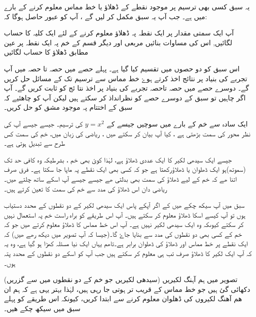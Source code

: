 
یہ سبق کسی بھی  ترسیم پر موجود نقطے کے ڈھلاؤ یا خط مماس معلوم کرنے کے بارے میں ہے۔  جب آپ یہ سبق مکمل کر لیں گے ، آپ کو عبور حاصل ہوگا کہ:
 
 
آپ ایک سمتی مقدار پر ایک نقطہ پہ  ڈھلاؤ معلوم کرنے کے لئے ایک کلیہ کا حساب لگائیں, اس کی مساوات بنائیں
 مربعی اور دیگر قسم کے خم پہ ایک نقطہ پر عین مطابق ڈھلاؤ کا حساب لگائیں 
 

اس سبق کو دو حصوں میں تقسیم کیا گیا ہے۔ پہلے حصے میں حصہ  تا حصہ   میں آپ تجربے کی بنیاد پر نتائج اخذ کرتے ہوۓ خط مماس سے ترسیم تک کے مسائل حل کریں گے۔ دوسرے حصے میں حصہ   تاحصہ   تجربے کی بنیاد پر اخذ   نتا ئج کو  ثابت کریں گے۔
آپ اگر چاہیں تو سبق کے دوسرے حصے کو نظرانداذ کر سکتے ہیں لیکن آپ کو چاھئیے کہ سبق کے اختتام پہ موجود مشق کو حل کریں۔

 
ایک سادہ سے خم کے بارے میں سوچیں جیسے کے  \( y=x^{2}\) کی ترسیم۔ جیسے جیسے  آپ کی نظر   محور کی سمت بڑھتی ہے ، کیا آپ بیان کر سکتے ھیں ، ریاضی کی زبان میں، خم کی سمت کس طرح سے تبدیل ہوتی ہے۔

جیسے ایک سیدھی لکیر کا ایک عددی ڈھلاؤ ہے، لہٰذا کوئ بھی خم ، بشرطیکہ وہ کافی حد تک (سموتھ)ہو ایک ڈھلوان یا ڈھلاؤرکھتا ہے جو کہ کسی بھی ایک نقطے پہ ماپا جا سکتا ہے۔ فرق صرف اتنا ھے کہ خم کے لیے ڈھلاؤ کی سمت بھی بدلتی ھے جیسے جیسے آپ اسکے ساتھ چلتے ھیں۔ ریاضی دان اس ڈھلاؤ کی مدد سے خم کی سمت کا تعین کرتے ہیں۔


سبق  میں آپ سیکھ چکے ھیں کے اگر آپکے پاس ایک سیدھی لکیر کے دو نقطوں کے محدد دستیاب ہوں تو آپ کیسے اسکا ڈھلاؤ معلوم کر سکتے ہیں۔ آپ اس طریقے کو براہ راست خم پہ استعمال نہیں کر سکتے کیوںکہ وہ ایک سیدھی لکیر نہیں ہے۔ آپ اس خط مماس کا ڈھلاؤ معلوم کرتے ھیں جو کہ خم کے  کسی بھی دو نقطوں کی مدد سے بنایا جاۓ گا۔(جیسا کہ آپ تصویر میں دیکھ رھے ھیں) کہ ایک نقطے پر خط مماس اور ڈھلاؤ کی ڈھلوان برابر ہے۔تاھم یہاں ایک نیا مسئلہ کھڑا ہو گیا ہے، وہ یہ کہ آپ ایک لکیر کا ڈھلاؤ صرف تب ہی معلوم کر سکتے ہیں جب آپ کو اسکے دو نقطوں کے محدد  پتہ ہوں۔

تصویر  میں ہم آہنگ لکیریں (سیدھی لکیریں جو خم کے دو نقطوں میں سے گزریں) دکھائی گئ ہیں جو خط مماس کے قریب تر ہوتی جا رہی ہیں، لہٰذا بہتر یہی ہے کہ ہم ان ھم آھنگ لکیروں کی ڈھلوان معلوم کرنے سے ابتدا کریں، کیونکہ اس طریقے کو پہلے سبق میں سیکھ چکے ھیں۔




